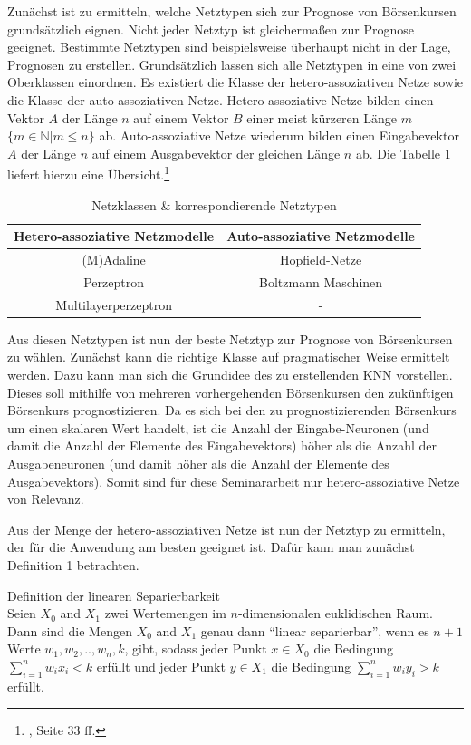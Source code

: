 Zunächst ist zu ermitteln, welche Netztypen sich zur Prognose von Börsenkursen grundsätzlich eignen. Nicht jeder Netztyp ist gleichermaßen zur Prognose geeignet. Bestimmte Netztypen sind beispielsweise überhaupt nicht in der Lage, Prognosen zu erstellen. Grundsätzlich lassen sich alle Netztypen in eine von zwei Oberklassen einordnen. Es existiert die Klasse der hetero-assoziativen Netze sowie die Klasse der auto-assoziativen Netze. Hetero-assoziative Netze bilden einen Vektor $A$ der Länge $n$ auf einem Vektor $B$ einer meist kürzeren Länge $m$ $\{m \in \mathbb{N} | m \le n\}$ ab. Auto-assoziative Netze wiederum bilden einen Eingabevektor $A$ der Länge $n$ auf einem Ausgabevektor der gleichen Länge $n$ ab. Die Tabelle \ref{tab:Netztypen} liefert hierzu eine Übersicht.\footnote{\Vgl{}, Seite 33 ff.}

\begin{table}[H]
\centering
\begin{tabular}{|c|c|}
\hline 
\textbf{Hetero-assoziative Netzmodelle} & \textbf{Auto-assoziative Netzmodelle} \\ 
\hline 
(M)Adaline & Hopfield-Netze \\ 
\hline  
Perzeptron &  Boltzmann Maschinen \\ 
\hline 
Multilayerperzeptron & - \\ 
\hline 
\end{tabular} 
\label{tab:Netztypen}
\caption{Netzklassen \& korrespondierende Netztypen}
\end{table}

Aus diesen Netztypen ist nun der beste Netztyp zur Prognose von Börsenkursen zu wählen. Zunächst kann die richtige Klasse auf pragmatischer Weise ermittelt werden. Dazu kann man sich die Grundidee des zu erstellenden KNN vorstellen. Dieses soll mithilfe von mehreren vorhergehenden Börsenkursen den zukünftigen Börsenkurs prognostizieren. Da es sich bei den zu prognostizierenden Börsenkurs um einen skalaren Wert handelt, ist die Anzahl der Eingabe-Neuronen (und damit die Anzahl der Elemente des Eingabevektors) höher als die Anzahl der Ausgabeneuronen (und damit höher als die Anzahl der Elemente des Ausgabevektors). Somit sind für diese Seminararbeit nur hetero-assoziative Netze von Relevanz.

Aus der Menge der hetero-assoziativen Netze ist nun der Netztyp zu ermitteln, der für die Anwendung am besten geeignet ist. Dafür kann man zunächst Definition 1 betrachten.

\begin{defi}Definition der linearen Separierbarkeit\\
Seien $X_{0}$ and $X_{1}$ zwei Wertemengen im $n$-dimensionalen euklidischen Raum. Dann sind die Mengen $X_{0}$ and $X_{1}$ genau dann  "`linear separierbar"', wenn es  $n+1$ Werte $w_{1}, w_{2},..,w_{n}, k$, gibt, sodass jeder Punkt  $x \in X_{0}$ die Bedingung $\sum^{n}_{i=1} w_{i}x_{i} < k$ erfüllt und jeder Punkt $y \in X_{1}$ die Bedingung $\sum^{n}_{i=1} w_{i}y_{i} > k$ erfüllt.
\end{defi}

